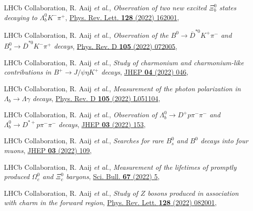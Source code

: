 \begin{cvcontent}
\begin{enumerate}[label={[\arabic*]}, leftmargin=1.5cm]
    \item LHCb Collaboration, R. Aaij \emph{et al.}, 
    \emph{Observation of two new excited $\Xi_b^0$ states decaying to  $\Lambda_b^0 K^- \pi^+$},
    \href{https://link.aps.org/doi/10.1103/PhysRevLett.128.162001}{Phys. Rev. Lett. \textbf{128} (2022) 162001},
    \item LHCb Collaboration, R. Aaij \emph{et al.}, 
    \emph{Observation of the $B^0\rightarrow\overline{D}^{*0}K^{+}\pi^{-}$ and $B_s^0\rightarrow\overline{D}^{*0}K^{-}\pi^{+}$ decays},
    \href{https://link.aps.org/doi/10.1103/PhysRevD.105.072005}{Phys. Rev. D \textbf{105} (2022) 072005},
    \item LHCb Collaboration, R. Aaij \emph{et al.},
    \emph{Study of charmonium and charmonium-like contributions in $B^+ \rightarrow J/\psi \eta K^+$ decays},
    \href{https://doi.org/10.1007/JHEP04(2022)046}{JHEP \textbf{04} (2022) 046},
    \item LHCb Collaboration, R. Aaij \emph{et al.}, 
    \emph{Measurement of the photon polarization in $\Lambda_b \to \Lambda \gamma$ decays},
    \href{https://link.aps.org/doi/10.1103/PhysRevD.105.L051104}{Phys. Rev. D \textbf{105} (2022) L051104},
    \item LHCb Collaboration, R. Aaij \emph{et al.}, 
    \emph{Observation of $\Lambda_b^0\rightarrow D^+ p \pi^-\pi^-$ and $\Lambda_b^0\rightarrow D^{*+} p \pi^-\pi^-$ decays},
    \href{https://doi.org/10.1007/JHEP03(2022)153}{JHEP \textbf{03} (2022) 153},
    \item LHCb Collaboration, R. Aaij \emph{et al.}, 
    \emph{Searches for rare $B_s^0$ and $B^0$ decays into four muons},
    \href{https://doi.org/10.1007/JHEP03(2022)109}{JHEP \textbf{03} (2022) 109},
    \item LHCb Collaboration, R. Aaij \emph{et al.}, 
    \emph{Measurement of the lifetimes of promptly produced $\Omega^{0}_{c}$ and $\Xi^{0}_{c}$ baryons},
    \href{https://doi.org/10.1016/j.scib.2021.11.022}{Sci. Bull. \textbf{67} (2022) 5},
    \item LHCb Collaboration, R. Aaij \emph{et al.}, 
    \emph{Study of $Z$ bosons produced in association with charm in the forward region},
    \href{https://journals.aps.org/prl/abstract/10.1103/PhysRevLett.128.082001}{Phys. Rev. Lett. \textbf{128} (2022) 082001},

\end{enumerate}
\end{cvcontent}
